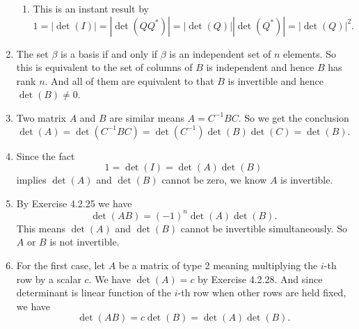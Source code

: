\begin{enumerate}
\begin{enumerate}
\item This is an instant result by 
\[1=|\det(I)|=|\det(QQ^*)|=|\det(Q)||\det(Q^*)|=|\det(Q)|^2.\]
\end{enumerate}
\item The set $\beta$ is a basis if and only if $\beta $ is an independent set of $n$ elements. So this is equivalent to the set of columns of $B$ is independent and hence $B$ has rank $n$. And all of them are equivalent to that $B$ is invertible and hence $\det(B)\neq 0$.
\item Two matrix $A$ and $B$ are similar means $A=C^{-1}BC$. So we get the conclusion
\[\det(A)=\det(C^{-1}BC)=\det(C^{-1})\det(B)\det(C)=\det(B).\]
\item Since the fact 
\[1=\det(I)=\det(A)\det(B)\]
implies $\det(A)$ and $\det(B)$ cannot be zero, we know $A$ is invertible.
\item By Exercise 4.2.25 we have 
\[\det(AB)=(-1)^n\det(A)\det(B).\]
This means $\det(A)$ and $\det(B)$ cannot be invertible simultaneously. So $A$ or $B$ is not invertible.
\item For the first case, let $A$ be a matrix of type 2 meaning multiplying the $i$-th row by a scalar $c$. We have $\det(A)=c$ by Exercise 4.2.28. And since determinant is linear function of the $i$-th row when other rows are held fixed, we have 
\[\det(AB)=c\det(B)=\det(A)\det(B).\]


\end{enumerate}
